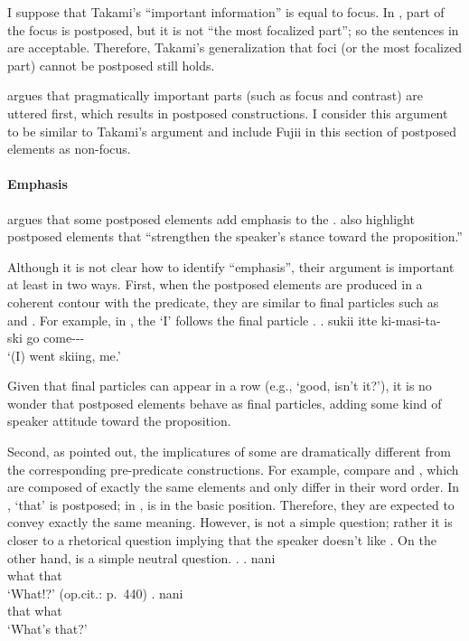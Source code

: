 I suppose that Takami's ``important information'' is equal to focus.
In \Last, part of the focus is postposed,
but it is not ``the most focalized part'';
so the sentences in \Last are acceptable.
Therefore,
Takami's generalization that foci (or the most focalized part) cannot be postposed still holds.

 argues that pragmatically important parts (such as focus and contrast) are uttered first,
which results in postposed constructions.
I consider this argument to be similar to Takami's argument and
include Fujii in this section of postposed elements as non-focus.


\paragraph{Emphasis}
\largerpage
{} argues that some postposed elements add emphasis to the .
 also highlight postposed elements that
``strengthen the speaker's stance toward the proposition.''

Although it is not clear how to identify ``emphasis'',
their argument is important at least in two ways.
First,
when the postposed elements are produced in a coherent contour with the predicate,
they are similar to final particles such as  and .
For example, in \Next,
the   `I' follows the final particle .
%
\exg. sukii itte ki-masi-ta-  \\
      ski go come---  \\
      `(I) went skiing, me.'
      \hfill{\cite[438]{onosuzuki92}}

Given that final particles can appear in a row (e.g.,  `good, isn't it?'),
it is no wonder that postposed elements behave as final particles, adding some kind of speaker attitude toward the proposition.

Second,
as  pointed out,
the implicatures of some  are dramatically different from the corresponding pre-pred\-i\-cate constructions. %
For example, compare \Next[a] and \Next[b], which are composed of exactly the same elements and only differ in their word order.
In \Next[a],  `that' is postposed;
in \Next[b],  is in the basic position.
Therefore, they are expected to convey exactly the same meaning.
However, \Next[a] is not a simple question;
rather it is closer to a rhetorical question implying that the speaker doesn't like .
On the other hand, \Next[b] is a simple neutral question.
%
\ex.
 \ag. nani  \\
      what that \\
      `What!?'
      \hfill{(op.cit.: p.~440)}
 \bg.  nani \\
       that what \\
       `What's that?'


